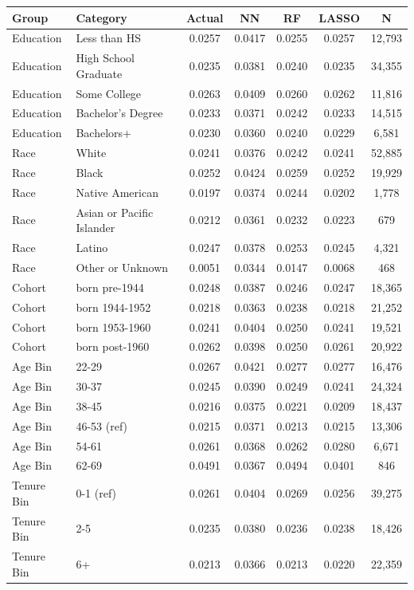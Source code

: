 \begin{tabular}{llccccc}
\hline\hline
Group & Category & Actual & NN & RF & LASSO & N \\
\hline
Education&Less than HS&0.0257&0.0417&0.0255&0.0257&12,793\\
Education&High School Graduate&0.0235&0.0381&0.0240&0.0235&34,355\\
Education&Some College&0.0263&0.0409&0.0260&0.0262&11,816\\
Education&Bachelor's Degree&0.0233&0.0371&0.0242&0.0233&14,515\\
Education&Bachelors+&0.0230&0.0360&0.0240&0.0229&6,581\\
Race&White&0.0241&0.0376&0.0242&0.0241&52,885\\
Race&Black&0.0252&0.0424&0.0259&0.0252&19,929\\
Race&Native American&0.0197&0.0374&0.0244&0.0202&1,778\\
Race&Asian or Pacific Islander&0.0212&0.0361&0.0232&0.0223&679\\
Race&Latino&0.0247&0.0378&0.0253&0.0245&4,321\\
Race&Other or Unknown&0.0051&0.0344&0.0147&0.0068&468\\
Cohort&born pre-1944&0.0248&0.0387&0.0246&0.0247&18,365\\
Cohort&born 1944-1952&0.0218&0.0363&0.0238&0.0218&21,252\\
Cohort&born 1953-1960&0.0241&0.0404&0.0250&0.0241&19,521\\
Cohort&born post-1960&0.0262&0.0398&0.0250&0.0261&20,922\\
Age Bin&22-29&0.0267&0.0421&0.0277&0.0277&16,476\\
Age Bin&30-37&0.0245&0.0390&0.0249&0.0241&24,324\\
Age Bin&38-45&0.0216&0.0375&0.0221&0.0209&18,437\\
Age Bin&46-53 (ref)&0.0215&0.0371&0.0213&0.0215&13,306\\
Age Bin&54-61&0.0261&0.0368&0.0262&0.0280&6,671\\
Age Bin&62-69&0.0491&0.0367&0.0494&0.0401&846\\
Tenure Bin&0-1 (ref)&0.0261&0.0404&0.0269&0.0256&39,275\\
Tenure Bin&2-5&0.0235&0.0380&0.0236&0.0238&18,426\\
Tenure Bin&6+&0.0213&0.0366&0.0213&0.0220&22,359\\
\hline\hline
\end{tabular}
